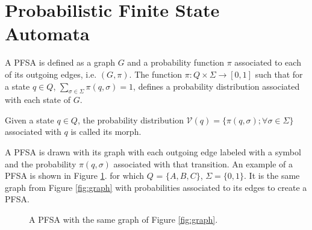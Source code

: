{\section{Probabilistic Finite State Automata}

\begin{definition}\label{definition:pfsa}
A PFSA is defined as a graph $G$ and a probability function $\pi$ associated to each of its outgoing edges, i.e. $(G, \pi)$. The function $\pi: Q\times\Sigma \rightarrow [0,1]$ such that for a state $q \in Q$, $\sum\limits_{\sigma\in\Sigma}\pi(q,\sigma) = 1$, defines a probability distribution associated with each state of $G$.
\end{definition} 

\begin{definition}\label{definition:morph}
Given a state $q \in Q$, the probability distribution $\mathcal{V}(q) = \{ \pi(q, \sigma); \forall \sigma \in \Sigma\}$ associated with $q$ is called its morph.  
\end{definition}

A PFSA is drawn with its graph with each outgoing edge labeled with a symbol and the probability $\pi(q,\sigma)$ associated with that transition. An example of a PFSA is shown in Figure \ref{fig:pfsa}. for which $Q$ = $\{A, B, C\}$, $\Sigma = \{0, 1\}$. It is the same graph from Figure \ref{fig:graph} with probabilities associated to its edges to create a PFSA.

\begin{figure}
\centering
{}
\caption{A PFSA with the same graph of Figure \ref{fig:graph}.\label{fig:pfsa}}
\end{figure}

}
